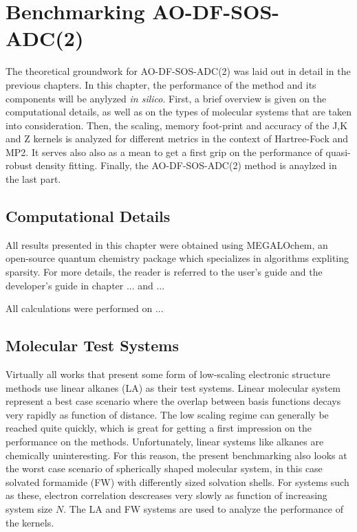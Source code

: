 \chapter{Benchmarking AO-DF-SOS-ADC(2)}

The theoretical groundwork for AO-DF-SOS-ADC(2) was laid out in detail in the previous chapters. In this chapter, the performance of the method and its components will be anylyzed \emph{in silico}. First, a brief overview is given on the computational details, as well as on the types of molecular systems that are taken into consideration. Then, the scaling, memory foot-print and accuracy of the J,K and Z kernels is analyzed for different metrics in the context of Hartree-Fock and MP2. It serves also also as a mean to get a first grip on the performance of quasi-robust density fitting. Finally, the AO-DF-SOS-ADC(2) method is anaylzed in the last part.  

\section{Computational Details}

All results presented in this chapter were obtained using MEGALOchem, an open-source quantum chemistry package which specializes in algorithms expliting sparsity. For more details, the reader is referred to the user's guide and the developer's guide in chapter ... and ... 

All calculations were performed on ...

\section{Molecular Test Systems}

Virtually all works that present some form of low-scaling electronic structure methods use linear alkanes (LA) as their test systems. Linear molecular system represent a best case scenario where the overlap between basis functions decays very rapidly as function of distance. The low scaling regime can generally be reached quite quickly, which is great for getting a first impression on the performance on the methods. Unfortunately, linear systems like alkanes are chemically uninteresting. For this reason, the present benchmarking also looks at the worst case scenario of spherically shaped molecular system, in this case solvated formamide (FW) with differently sized solvation shells. For systems such as these, electron correlation descreases very slowly as function of increasing system size $N$. The LA and FW systems are used to analyze the performance of the kernels.

